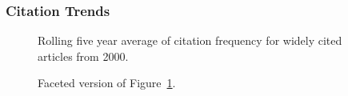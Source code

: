 \documentclass[
  10pt,
  letterpaper,
  DIV=11,
  numbers=noendperiod,
  twoside]{scrartcl}
\begin{document}
\subsubsection*{Citation Trends}\label{citation-trends-24}

\begin{figure}


\caption{\label{fig-citation-spaghetti-2000}Rolling five year average of
citation frequency for widely cited articles from 2000.}

\end{figure}%

\begin{figure}


\caption{\label{fig-citation-facet-2000}Faceted version of
Figure~\ref{fig-citation-spaghetti-2000}.}

\end{figure}%
\end{document}
